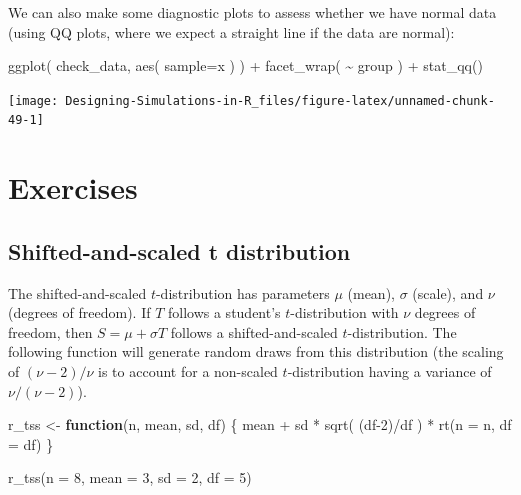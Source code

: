 \documentclass[
]{book}
\newenvironment{Shaded}{\begin{snugshade}}{\end{snugshade}}
\newcommand{\AttributeTok}[1]{\textcolor[rgb]{0.77,0.63,0.00}{#1}}
\newcommand{\ControlFlowTok}[1]{\textcolor[rgb]{0.13,0.29,0.53}{\textbf{#1}}}
\newcommand{\DecValTok}[1]{\textcolor[rgb]{0.00,0.00,0.81}{#1}}
\newcommand{\FunctionTok}[1]{\textcolor[rgb]{0.00,0.00,0.00}{#1}}
\newcommand{\NormalTok}[1]{#1}
\newcommand{\OtherTok}[1]{\textcolor[rgb]{0.56,0.35,0.01}{#1}}
\newcommand{\SpecialCharTok}[1]{\textcolor[rgb]{0.00,0.00,0.00}{#1}}
\begin{document}
We can also make some diagnostic plots to assess whether we have normal data (using QQ plots, where we expect a straight line if the data are normal):

\begin{Shaded}
\begin{Highlighting}[]
\FunctionTok{ggplot}\NormalTok{( check\_data, }\FunctionTok{aes}\NormalTok{( }\AttributeTok{sample=}\NormalTok{x ) ) }\SpecialCharTok{+}
  \FunctionTok{facet\_wrap}\NormalTok{( }\SpecialCharTok{\textasciitilde{}}\NormalTok{ group ) }\SpecialCharTok{+}
  \FunctionTok{stat\_qq}\NormalTok{()}
\end{Highlighting}
\end{Shaded}

\begin{center}\texttt{[image: Designing-Simulations-in-R\_files/figure-latex/unnamed-chunk-49-1]} \end{center}

\hypertarget{exercises}{%
\section{Exercises}\label{exercises}}

\hypertarget{shifted-and-scaled-t-distribution}{%
\subsection{Shifted-and-scaled t distribution}\label{shifted-and-scaled-t-distribution}}

The shifted-and-scaled \(t\)-distribution has parameters \(\mu\) (mean), \(\sigma\) (scale), and \(\nu\) (degrees of freedom).
If \(T\) follows a student's \(t\)-distribution with \(\nu\) degrees of freedom, then \(S = \mu + \sigma T\) follows a shifted-and-scaled \(t\)-distribution.
The following function will generate random draws from this distribution (the scaling of \((\nu-2)/\nu\) is to account for a non-scaled \(t\)-distribution having a variance of \(\nu/(\nu-2)\)).

\begin{Shaded}
\begin{Highlighting}[]
\NormalTok{r\_tss }\OtherTok{\textless{}{-}} \ControlFlowTok{function}\NormalTok{(n, mean, sd, df) \{}
\NormalTok{  mean }\SpecialCharTok{+}\NormalTok{ sd }\SpecialCharTok{*} \FunctionTok{sqrt}\NormalTok{( (df}\DecValTok{{-}2}\NormalTok{)}\SpecialCharTok{/}\NormalTok{df ) }\SpecialCharTok{*} \FunctionTok{rt}\NormalTok{(}\AttributeTok{n =}\NormalTok{ n, }\AttributeTok{df =}\NormalTok{ df)}
\NormalTok{\}}

\FunctionTok{r\_tss}\NormalTok{(}\AttributeTok{n =} \DecValTok{8}\NormalTok{, }\AttributeTok{mean =} \DecValTok{3}\NormalTok{, }\AttributeTok{sd =} \DecValTok{2}\NormalTok{, }\AttributeTok{df =} \DecValTok{5}\NormalTok{)}
\end{Highlighting}
\end{Shaded}
\end{document}
